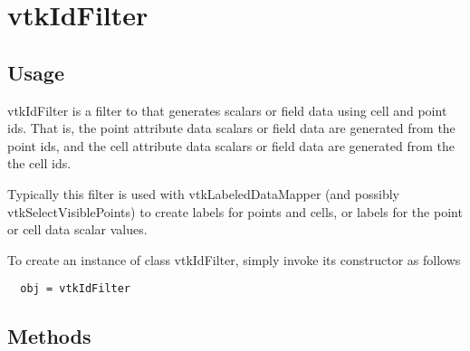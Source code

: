 \section{vtkIdFilter}

\subsection{Usage}

 vtkIdFilter is a filter to that generates scalars or field data
 using cell and point ids. That is, the point attribute data scalars
 or field data are generated from the point ids, and the cell
 attribute data scalars or field data are generated from the the
 cell ids.

 Typically this filter is used with vtkLabeledDataMapper (and possibly
 vtkSelectVisiblePoints) to create labels for points and cells, or labels
 for the point or cell data scalar values.

To create an instance of class vtkIdFilter, simply
invoke its constructor as follows
\begin{verbatim}
  obj = vtkIdFilter
\end{verbatim}
\subsection{Methods}

